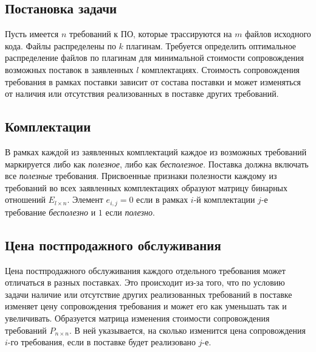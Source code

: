 

\subsection*{Постановка задачи}
Пусть имеется $n$ требований к ПО, которые трассируются на $m$ файлов исходного кода. Файлы распределены по $k$ плагинам. Требуется определить оптимальное распределение файлов по плагинам для минимальной стоимости сопровождения возможных поставок в заявленных $l$ комплектациях. Стоимость сопровождения требования в рамках поставки зависит от состава поставки и может изменяться от наличия или отсутствия реализованных в поставке других требований.

\subsection*{Комплектации}
В рамках каждой из заявленных комплектаций каждое из возможных требований маркируется либо как \textit{полезное}, либо как \textit{бесполезное}. Поставка должна включать все \textit{полезные} требования. Присвоенные признаки полезности каждому из требований во всех заявленных комплектациях образуют матрицу бинарных отношений $E_{l \times n}$. Элемент $e_{i, j} = 0$ если в рамках $i$-й комплектации $j$-е требование \textit{бесполезно} и $1$ если \textit{полезно}.

\subsection*{Цена постпродажного обслуживания}
Цена постпродажного обслуживания каждого отдельного требования может отличаться в разных поставках. Это происходит из-за того, что по условию задачи наличие или отсутствие других реализованных требований в поставке изменяет цену сопровождения требования и может его как уменьшать так и увеличивать. Образуется матрица изменения стоимости сопровождения требований $P_{n \times n}$. В ней указывается, на сколько изменится цена сопровождения $i$-го требования, если в поставке будет реализовано $j$-е.

